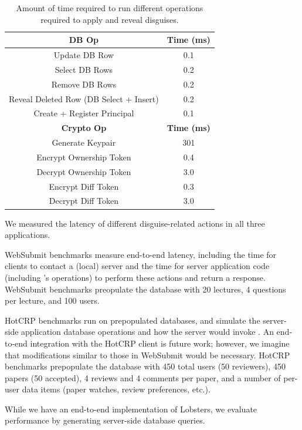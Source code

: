 \begin{table}[h!]
\begin{center}
\begin{tabular}{ c c }
\hline
\textbf{DB Op} & \textbf{Time (ms)}\\
\hline
Update DB Row & 0.1\\ 
Select DB Rows & 0.2\\
Remove DB Rows & 0.2\\
Reveal Deleted Row (DB Select + Insert) & 0.2 \\
Create + Register Principal & 0.1\\
\hline
\textbf{Crypto Op} & \textbf{Time (ms)}\\
\hline
Generate Keypair & 301\\
Encrypt Ownership Token & 0.4\\
Decrypt Ownership Token & 3.0\\
Encrypt Diff Token & 0.3\\
Decrypt Diff Token & 3.0\\
\end{tabular}
\end{center}
\caption{Amount of time required to run different operations required to apply and reveal disguises.}
\label{tab:opstats}
\end{table}

We measured the latency of different disguise-related actions in all three applications.

WebSubmit benchmarks measure end-to-end latency, including the time for clients to contact a (local)
server and the time for server application code (including \sys's operations) to perform these
actions and return a response.
%
WebSubmit benchmarks preopulate the database with 20 lectures, 4 questions per lecture, and 100
users.

HotCRP benchmarks run on prepopulated databases, and simulate the server-side application database
operations and how the server would invoke \sys.  An end-to-end integration with the HotCRP client
is future work; however, we imagine that modifications similar to those in WebSubmit would be
necessary.
%
HotCRP benchmarks prepopulate the database with 450 total users (50 reviewers), 450 papers (50
accepted), 4 reviews and 4 comments per paper, and a number of per-user data items (\eg paper
watches, review preferences, etc.).  

While we have an end-to-end implementation of Lobsters, we evaluate performance by generating
server-side database queries.

